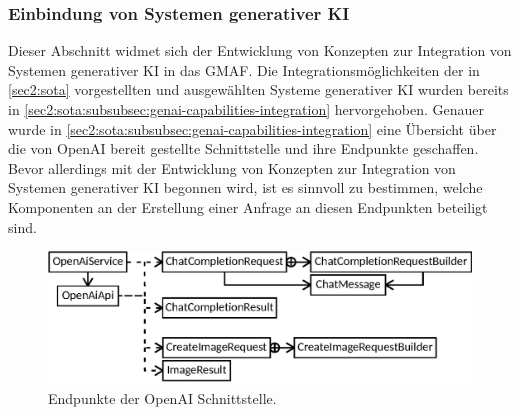 %
%
%
%
%

\subsubsection{Einbindung von Systemen generativer KI}
\label{sec3:model:subsubsec:genai-integration}
Dieser Abschnitt widmet sich der Entwicklung von Konzepten zur Integration von Systemen generativer KI in das GMAF.
Die Integrationsmöglichkeiten der in \cref{sec2:sota} vorgestellten und ausgewählten Systeme generativer KI wurden bereits in \cref{sec2:sota:subsubsec:genai-capabilities-integration} hervorgehoben.
Genauer wurde in \cref{sec2:sota:subsubsec:genai-capabilities-integration} eine Übersicht über die von OpenAI bereit gestellte Schnittstelle und ihre Endpunkte geschaffen.
Bevor allerdings mit der Entwicklung von Konzepten zur Integration von Systemen generativer KI begonnen wird, ist es sinnvoll zu bestimmen, welche Komponenten an der Erstellung einer Anfrage an diesen Endpunkten beteiligt sind.

\begin{figure}[htb]
    \centering
    \includegraphics{chapter/chapter_3/mechanisms/openai-endpoint-mech.eps}
    \caption{Endpunkte der OpenAI Schnittstelle.}
    \label{sec3:model:subsubsec:genai-integration:fig:openai-endpoint-comps}
\end{figure}

